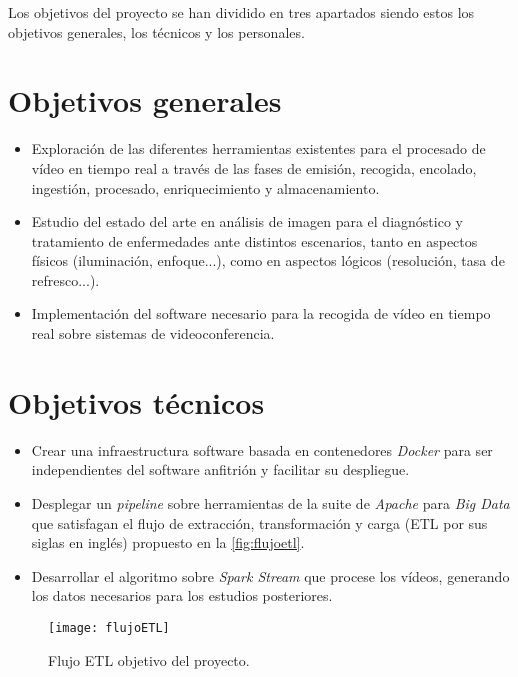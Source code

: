 Los objetivos del proyecto se han dividido en tres apartados siendo estos los objetivos generales, los técnicos y los personales.

\section{Objetivos generales}

\begin{itemize}
	\item Exploración de las diferentes herramientas existentes para el procesado de vídeo en tiempo real a través de las fases de emisión, recogida, encolado, ingestión, procesado, enriquecimiento y almacenamiento.
	\item Estudio del estado del arte en análisis de imagen para el diagnóstico y tratamiento de enfermedades ante distintos escenarios, tanto en aspectos físicos (iluminación, enfoque...), como en aspectos lógicos (resolución, tasa de refresco...).
	\item Implementación del software necesario para la recogida de vídeo en tiempo real sobre sistemas de videoconferencia.
\end{itemize}

\section{Objetivos técnicos}

\begin{itemize}
	\item Crear una infraestructura software basada en contenedores \textit{Docker} para ser independientes del software anfitrión y facilitar su despliegue.
	\item Desplegar un \textit{pipeline} sobre herramientas de la suite de \textit{Apache} para \textit{Big Data} que satisfagan el flujo de extracción, transformación y carga (ETL por sus siglas en inglés) propuesto en la \autoref{fig:flujoetl}.
	\item Desarrollar el algoritmo sobre \textit{Spark Stream} que procese los vídeos, generando los datos necesarios para los estudios posteriores. 
\end{itemize}

\begin{figure}
	\centering
	\texttt{[image: flujoETL]}
	\caption{Flujo ETL objetivo del proyecto.}
	\label{fig:flujoetl}
\end{figure}


